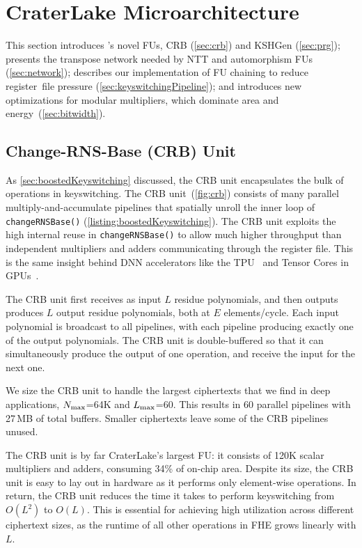 \section{CraterLake Microarchitecture}\label{sec:architecture}

This section introduces \name's novel FUs, CRB (\autoref{sec:crb}) and KSHGen
(\autoref{sec:prg}); presents the transpose network needed by NTT and
automorphism FUs (\autoref{sec:network}); describes our implementation of FU
chaining to reduce register~file pressure (\autoref{sec:keyswitchingPipeline});
and introduces new optimizations for modular multipliers, which dominate area
and energy~(\autoref{sec:bitwidth}).

\subsection{Change-RNS-Base (CRB) Unit}\label{sec:crb}

\figCRB

As \autoref{sec:boostedKeyswitching} discussed, the CRB unit encapsulates the bulk of
operations in keyswitching. The CRB unit~(\autoref{fig:crb}) consists of many
parallel multiply-and-accumulate pipelines that spatially unroll the inner loop
of \verb!changeRNSBase()! (\autoref{listing:boostedKeyswitching}). The CRB unit
exploits the high internal reuse in \verb!changeRNSBase()! to allow much higher
throughput than independent multipliers and adders communicating through the
register file. This is the same insight behind DNN accelerators like the
TPU~\cite{jouppi:isca17:tpu} and Tensor Cores in
GPUs~\cite{choquette2021nvidia}.

The CRB unit first receives as input $L$ residue polynomials, and then outputs
produces $L$ output residue polynomials, both at $E$ elements/cycle. Each input
polynomial is broadcast to all pipelines, with each pipeline producing exactly
one of the output polynomials. The CRB unit is double-buffered so that it can
simultaneously produce the output of one operation, and receive the input for
the next one.

We size the CRB unit to handle the largest ciphertexts that we find in deep
applications, $N_{\textrm{max}}$=64K and $L_{\textrm{max}}$=60. This results in 60 parallel pipelines
with 27\,MB of total buffers. Smaller ciphertexts leave some of the CRB
pipelines unused.

The CRB unit is by far CraterLake's largest FU: it consists of 120K scalar
multipliers and adders, consuming 34\% of on-chip area. Despite its size, the
CRB unit is easy to lay out in hardware as it performs only element-wise
operations. In return, the CRB unit reduces the time it takes to perform
keyswitching from $O(L^2)$ to $O(L)$. This is essential for achieving high
utilization across different ciphertext sizes, as the runtime of all other
operations in FHE grows linearly with $L$.

